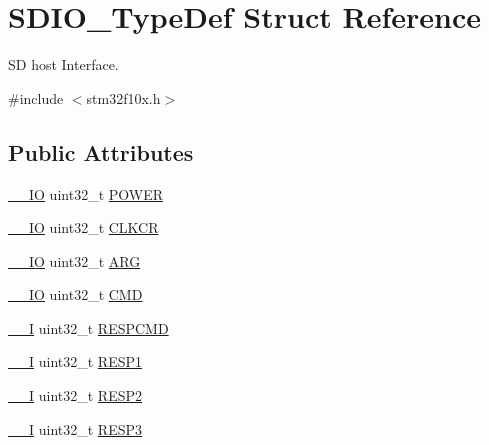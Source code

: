\hypertarget{struct_s_d_i_o___type_def}{}\section{S\+D\+I\+O\+\_\+\+Type\+Def Struct Reference}
\label{struct_s_d_i_o___type_def}


SD host Interface.  




{\ttfamily \#include $<$stm32f10x.\+h$>$}

\subsection*{Public Attributes}
\begin{DoxyCompactItemize}
\item 
\hyperlink{core__sc300_8h_aec43007d9998a0a0e01faede4133d6be}{\+\_\+\+\_\+\+IO} uint32\+\_\+t \hyperlink{struct_s_d_i_o___type_def_a7c156bc55f6d970a846a459d57a9e940}{P\+O\+W\+ER}
\item 
\hyperlink{core__sc300_8h_aec43007d9998a0a0e01faede4133d6be}{\+\_\+\+\_\+\+IO} uint32\+\_\+t \hyperlink{struct_s_d_i_o___type_def_aeb1e30ce2038628e45264f75e5e926bb}{C\+L\+K\+CR}
\item 
\hyperlink{core__sc300_8h_aec43007d9998a0a0e01faede4133d6be}{\+\_\+\+\_\+\+IO} uint32\+\_\+t \hyperlink{struct_s_d_i_o___type_def_a3e24392875e98cd09043e54a0990ab7a}{A\+RG}
\item 
\hyperlink{core__sc300_8h_aec43007d9998a0a0e01faede4133d6be}{\+\_\+\+\_\+\+IO} uint32\+\_\+t \hyperlink{struct_s_d_i_o___type_def_abbbdc3174e12dab21123d746d65f345d}{C\+MD}
\item 
\hyperlink{core__sc300_8h_af63697ed9952cc71e1225efe205f6cd3}{\+\_\+\+\_\+I} uint32\+\_\+t \hyperlink{struct_s_d_i_o___type_def_a9d881ed6c2fdecf77e872bcc6b404774}{R\+E\+S\+P\+C\+MD}
\item 
\hyperlink{core__sc300_8h_af63697ed9952cc71e1225efe205f6cd3}{\+\_\+\+\_\+I} uint32\+\_\+t \hyperlink{struct_s_d_i_o___type_def_a2b6f1ca5a5a50f8ef5417fe7be22553c}{R\+E\+S\+P1}
\item 
\hyperlink{core__sc300_8h_af63697ed9952cc71e1225efe205f6cd3}{\+\_\+\+\_\+I} uint32\+\_\+t \hyperlink{struct_s_d_i_o___type_def_a9228c8a38c07c508373644220dd322f0}{R\+E\+S\+P2}
\item 
\hyperlink{core__sc300_8h_af63697ed9952cc71e1225efe205f6cd3}{\+\_\+\+\_\+I} uint32\+\_\+t \hyperlink{struct_s_d_i_o___type_def_a70f3e911570bd326bff852664fd8a7d5}{R\+E\+S\+P3}

\end{DoxyCompactItemize}
